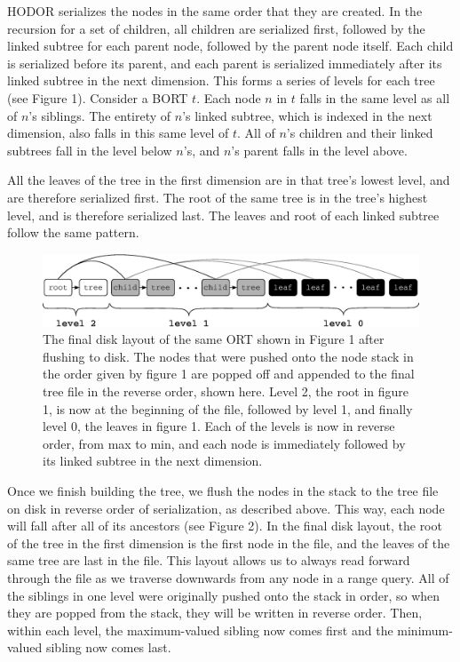 \documentclass[11pt, oneside]{article}
\begin{document}
HODOR serializes the nodes in the same order that they are created. In the
recursion for a set of children, all children are serialized first, followed by
the linked subtree for each parent node, followed by the parent node itself.
Each child is serialized before its parent, and each parent is serialized
immediately after its linked subtree in the next dimension. This forms a series
of levels \cite{seinfeld} for each tree (see Figure 1). Consider a BORT $t$.
Each node $n$ in $t$ falls in the same level as all of $n$'s siblings. The
entirety of $n$'s linked subtree, which is indexed in the next dimension, also
falls in this same level of $t$. All of $n$'s children and their linked subtrees
fall in the level below $n$'s, and $n$'s parent falls in the level above. 

All the leaves of the tree in the first dimension are in that tree's lowest
level, and are therefore serialized first. The root of the same tree is in the
tree's highest level, and is therefore serialized last. The leaves and root of
each linked subtree follow the same pattern. 

\begin{figure}[h!]
    \centering
    \includegraphics[width=1\textwidth]{fig2.eps}
    \caption{
        The final disk layout of the same ORT shown in Figure 1 after flushing
        to disk. The nodes that were pushed onto the node stack in the order
        given by figure 1 are popped off and appended to the final tree file in
        the reverse order, shown here. Level 2, the root in figure 1, is now at
        the beginning of the file, followed by level 1, and finally level 0,
        the leaves in figure 1. Each of the levels is now in reverse order,
        from max to min, and each node is immediately followed by its linked
        subtree in the next dimension. 
    }
    \vspace{0.5in}
\end{figure}

Once we finish building the tree, we flush the nodes in the stack to the tree
file on disk in reverse order of serialization, as described above. This way,
each node will fall after all of its ancestors (see Figure 2). In the final disk
layout, the root of the tree in the first dimension is the first node in the
file, and the leaves of the same tree are last in the file. This layout allows
us to always read forward through the file as we traverse downwards from any
node in a range query. All of the siblings in one level were originally pushed
onto the stack in order, so when they are popped from the stack, they will be
written in reverse order. Then, within each level, the maximum-valued sibling
now comes first and the minimum-valued sibling now comes last. 
\end{document}
